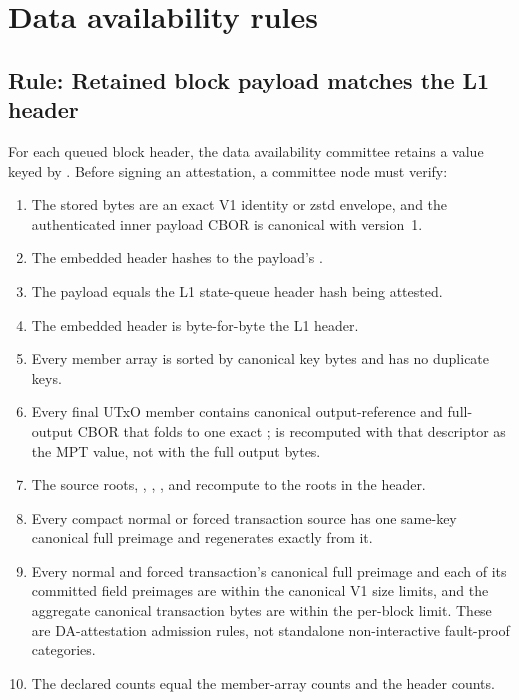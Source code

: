 \documentclass[../midgard.tex]{subfiles}
\begin{document}
\section{Data availability rules}
\label{h:data-availability-rules}

\subsection{Rule: Retained block payload matches the L1 header}

For each queued block header, the data availability committee retains a
 value keyed by .
Before signing an attestation, a committee node must verify:
\begin{enumerate}
    \item The stored bytes are an exact V1 identity or zstd envelope, and the
      authenticated inner payload CBOR is canonical with version~1.
    \item The embedded header hashes to the payload's .
    \item The payload  equals the L1 state-queue header hash being attested.
    \item The embedded header is byte-for-byte the L1 header.
    \item Every member array is sorted by canonical key bytes and has no duplicate keys.
    \item Every final UTxO member contains canonical output-reference and
      full-output CBOR that folds to one exact
      ;  is recomputed with
      that descriptor as the MPT value, not with the full output bytes.
    \item The source roots, ,
      , , and
       recompute to the roots in the header.
    \item Every compact normal or forced transaction source has one
      same-key canonical full preimage and regenerates exactly from it.
    \item Every normal and forced transaction's canonical full preimage and
      each of its committed field preimages are within the canonical V1 size
      limits, and the aggregate canonical transaction bytes are within the
      per-block limit. These are DA-attestation admission rules, not standalone
      non-interactive fault-proof categories.
    \item The declared counts equal the member-array counts and the header counts.

\end{enumerate}
\end{document}
